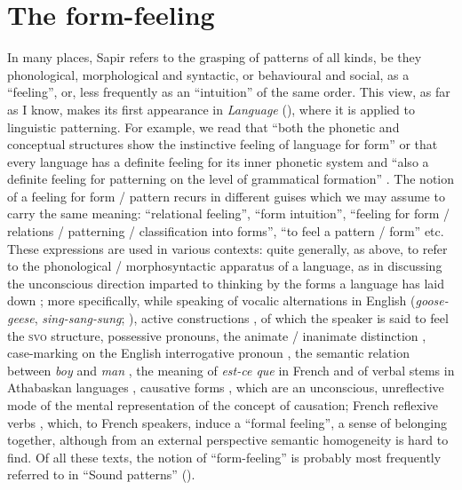 \documentclass[output=paper]{langscibook}
\begin{document}
\section{The form-feeling}
\label{sec:fortis:form-feeling}

In many places, Sapir refers to the grasping of patterns of all kinds, be they phonological, morphological and syntactic, or behavioural and social, as a ``feeling'', or, less frequently as an ``intuition'' of the same order. This view, as far as I know, makes its first appearance in \emph{Language} (\citeyear{Sapir1921}), where it is applied to linguistic patterning. For example, we read that ``both the phonetic and conceptual structures show the instinctive feeling of language for form'' \citep[56]{Sapir1921} or that every language has a definite feeling for its inner phonetic system and ``also a definite feeling for patterning on the level of grammatical formation'' \citep[61]{Sapir1921}. The notion of a feeling for form / pattern recurs in different guises which we may assume to carry the same meaning: ``relational feeling'', ``form intuition'', ``feeling for form / relations / patterning / classification into forms'', ``to feel a pattern / form'' etc. These expressions are used in various contexts: quite generally, as above, to refer to the phonological / morphosyntactic apparatus of a language, as in discussing the unconscious direction imparted to thinking by the forms a language has laid down \citep[153]{Sapir1924}; more specifically, while speaking of vocalic alternations in English (\emph{goose-geese}, \emph{sing-sang-sung}; \citealt[60--61]{Sapir1921}), active constructions \citep[84--85, 111]{Sapir1921}, of which the speaker is said to feel the \textsc{svo} structure, possessive pronouns, the animate / inanimate distinction \citep[156]{Sapir1921}, case-marking on the English interrogative pronoun \citep[159]{Sapir1921}, the semantic relation between \emph{boy} and \emph{man} \citep[61]{Sapir1929b}, the meaning of \emph{est-ce que} in French and of verbal stems in Athabaskan languages \citep[147]{Sapir1923}, causative forms \citep[154]{Sapir1924}, which are an unconscious, unreflective mode of the mental representation of the concept of causation;  French reflexive verbs \citep[116]{Sapir1931}, which, to French speakers, induce a ``formal feeling'', a sense of belonging together, although from an external perspective semantic homogeneity is hard to find. Of all these texts, the notion of ``form-feeling'' is probably most frequently referred to in ``Sound patterns'' (\citeyear{Sapir1925}).
\end{document}

